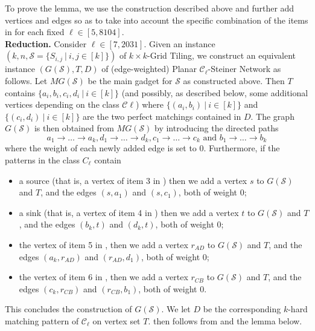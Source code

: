 \documentclass[a4paper,11pt]{article}
\theoremstyle{plain}
\newtheorem{identification rule}{Identification Rule}
\theoremstyle{definition}
\theoremstyle{remark}
\begin{document}
To prove the lemma, we use the construction described above and further add vertices and edges so as to take into account the specific combination of the items in  for each fixed $\ell \in [5,8104]$.\\

\noindent
\textbf{Reduction.} Consider $\ell \in [7,2031]$. Given an instance $(k,n,\mathcal{S}=\{S_{i,j}~|~i,j \in [k]\})$ of {\sc $k \times k$-Grid Tiling}, we construct an equivalent instance $(G(\mathcal{S}),T,D)$ of (edge-weighted) {\sc Planar $\mathcal{C}_\ell$-Steiner Network} as follows. Let $MG(\mathcal{S})$ be the main gadget for $\mathcal{S}$ as constructed above.
Then $T$ contains $\{a_i,b_i,c_i,d_i~|~i \in [k]\}$ (and possibly, as described below, some additional vertices depending on the class $\mathcal{C}\ell$) where $\{(a_i,b_i)~|~i \in [k]\}$ and $\{(c_i,d_i)~|~i \in [k]\}$ are the two perfect matchings contained in $D$. The graph $G(\mathcal{S})$ is then obtained from $MG(\mathcal{S})$ by introducing the directed paths
\[
a_1 \rightarrow \ldots \rightarrow a_k, d_1 \rightarrow \ldots \rightarrow d_k, c_1 \rightarrow \ldots \rightarrow c_k 
\text{ and } b_1 \rightarrow \ldots \rightarrow b_k
\]
where the weight of each newly added edge is set to 0. Furthermore, if the patterns in the class $C_\ell$ contain
\begin{itemize}
\item a source (that is, a vertex of item 3 in ) then we add a vertex $s$ to $G(\mathcal{S})$ and $T$, and the edges $(s,a_1)$ and $(s,c_1)$, both of weight 0;
\item a sink (that is, a vertex of item 4 in ) then we add a vertex $t$ to $G(\mathcal{S})$ and $T$, and the edges $(b_k,t)$ and $(d_k,t)$, both of weight 0;
\item the vertex of item 5 in , then we add a vertex $r_{AD}$ to $G(\mathcal{S})$ and $T$, and the edges $(a_k,r_{AD})$ and $(r_{AD},d_1)$, both of weight 0;
\item the vertex of item 6 in , then we add a vertex $r_{CB}$ to $G(\mathcal{S})$ and $T$, and the edges $(c_k,r_{CB})$ and $(r_{CB},b_1)$, both of weight 0.
\end{itemize}
This concludes the construction of $G(\mathcal{S})$. We let $D$ be the corresponding $k$-hard matching pattern of $\mathcal{C}_\ell$ on vertex set $T$.  then follows from  and the lemma below.
\end{document}

